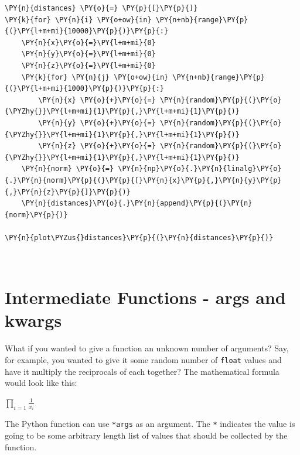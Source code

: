     \begin{tcolorbox}[breakable, size=fbox, boxrule=1pt, pad at break*=1mm,colback=cellbackground, colframe=cellborder]
\begin{Verbatim}[commandchars=\\\{\}]
\PY{n}{distances} \PY{o}{=} \PY{p}{[}\PY{p}{]}
\PY{k}{for} \PY{n}{i} \PY{o+ow}{in} \PY{n+nb}{range}\PY{p}{(}\PY{l+m+mi}{10000}\PY{p}{)}\PY{p}{:}
    \PY{n}{x}\PY{o}{=}\PY{l+m+mi}{0}
    \PY{n}{y}\PY{o}{=}\PY{l+m+mi}{0}
    \PY{n}{z}\PY{o}{=}\PY{l+m+mi}{0}
    \PY{k}{for} \PY{n}{j} \PY{o+ow}{in} \PY{n+nb}{range}\PY{p}{(}\PY{l+m+mi}{1000}\PY{p}{)}\PY{p}{:}
        \PY{n}{x} \PY{o}{+}\PY{o}{=} \PY{n}{random}\PY{p}{(}\PY{o}{\PYZhy{}}\PY{l+m+mi}{1}\PY{p}{,}\PY{l+m+mi}{1}\PY{p}{)}
        \PY{n}{y} \PY{o}{+}\PY{o}{=} \PY{n}{random}\PY{p}{(}\PY{o}{\PYZhy{}}\PY{l+m+mi}{1}\PY{p}{,}\PY{l+m+mi}{1}\PY{p}{)}
        \PY{n}{z} \PY{o}{+}\PY{o}{=} \PY{n}{random}\PY{p}{(}\PY{o}{\PYZhy{}}\PY{l+m+mi}{1}\PY{p}{,}\PY{l+m+mi}{1}\PY{p}{)}
    \PY{n}{norm} \PY{o}{=} \PY{n}{np}\PY{o}{.}\PY{n}{linalg}\PY{o}{.}\PY{n}{norm}\PY{p}{(}\PY{p}{[}\PY{n}{x}\PY{p}{,}\PY{n}{y}\PY{p}{,}\PY{n}{z}\PY{p}{]}\PY{p}{)}
    \PY{n}{distances}\PY{o}{.}\PY{n}{append}\PY{p}{(}\PY{n}{norm}\PY{p}{)}

\PY{n}{plot\PYZus{}distances}\PY{p}{(}\PY{n}{distances}\PY{p}{)}
\end{Verbatim}
\end{tcolorbox}

    \begin{center}
    \end{center}
    { \hspace*{\fill} \\}
\section{Intermediate Functions - args and kwargs}
What if you wanted to give a function an unknown number of arguments?
Say, for example, you wanted to give it some random number of
\texttt{float} values and have it multiply the reciprocals of each
together? The mathematical formula would look like this:

\(\prod\limits_{i=1}\frac{1}{x_i}\)

The Python function can use \texttt{*args} as an argument. The
\texttt{*} indicates the value is going to be some arbitrary length list
of values that should be collected by the function.

